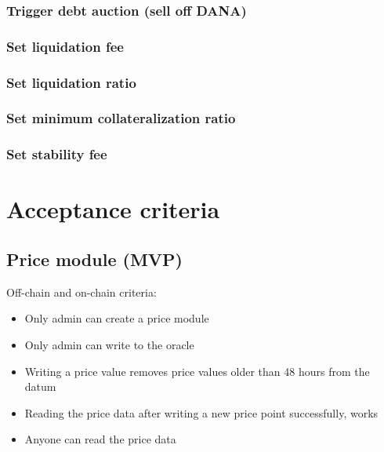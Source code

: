 \documentclass{article} %
\begin{document}
\subsubsection{Trigger debt auction (sell off DANA)}

\subsubsection{Set liquidation fee}

\subsubsection{Set liquidation ratio}

\subsubsection{Set minimum collateralization ratio}


\subsubsection{Set stability fee}

\section{Acceptance criteria}

\subsection{Price module (MVP)}

Off-chain and on-chain criteria:
\begin{itemize}
  \item Only admin can create a price module
  \item Only admin can write to the oracle
  \item Writing a price value removes price values older than 48 hours from the
    datum
  \item Reading the price data after writing a new price point successfully,
    works
  \item Anyone can read the price data
\end{itemize}
\end{document}
